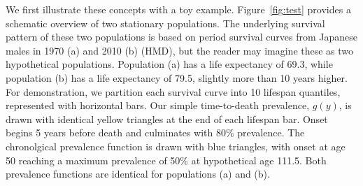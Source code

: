 \documentclass[11pt,oneside,a4paper]{article} %
\begin{document}
We first illustrate these concepts with a toy example. Figure~\ref{fig:test}
provides a schematic overview of two stationary populations. The
underlying survival pattern of these two populations is based on period survival
curves from Japanese males in 1970 (a) and 2010 (b) (HMD), but the reader may
imagine these as two hypothetical populations. Population (a) has a life
expectancy of 69.3, while population (b) has a life expectancy of 79.5, slightly
more than 10 years higher. For demonstration, we partition each survival curve
into 10 lifespan quantiles, represented with horizontal bars. Our simple
time-to-death prevalence, $g(y)$, is drawn with identical yellow triangles at
the end of each lifespan bar. Onset begins 5 years before death and culminates with 80\%
prevalence. The chronolgical prevalence function is drawn with blue triangles,
with onset at age 50 reaching a maximum prevalence of 50\% at hypothetical age
111.5. Both prevalence functions are identical for populations (a) and (b). 
\end{document}
